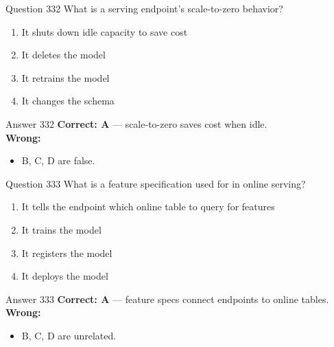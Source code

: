 \documentclass[aspectratio=169,11pt]{beamer}
\begin{document}
	\begin{frame}{Question 332}
		What is a serving endpoint's scale-to-zero behavior?
		\begin{enumerate}[label=\Alph*.]
			\item It shuts down idle capacity to save cost
			\item It deletes the model
			\item It retrains the model
			\item It changes the schema
		\end{enumerate}
	\end{frame}
	\begin{frame}{Answer 332}
		\textbf{Correct: A} --- scale-to-zero saves cost when idle.\\
		\vspace{0.5em}
		\textbf{Wrong:}
		\begin{itemize}
			\item B, C, D are false.
		\end{itemize}
	\end{frame}
	
	\begin{frame}{Question 333}
		What is a feature specification used for in online serving?
		\begin{enumerate}[label=\Alph*.]
			\item It tells the endpoint which online table to query for features
			\item It trains the model
			\item It registers the model
			\item It deploys the model
		\end{enumerate}
	\end{frame}
	\begin{frame}{Answer 333}
		\textbf{Correct: A} --- feature specs connect endpoints to online tables.\\
		\vspace{0.5em}
		\textbf{Wrong:}
		\begin{itemize}
			\item B, C, D are unrelated.
		\end{itemize}
	\end{frame}
	
\end{document}
